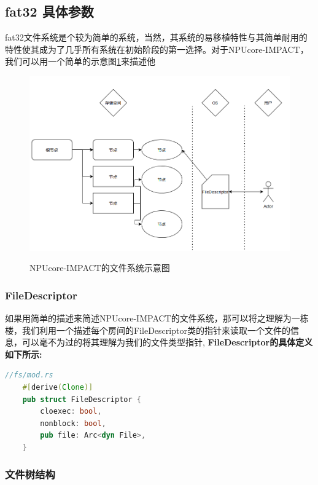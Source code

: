\subsection{fat32 具体参数}

fat32文件系统是个较为简单的系统，当然，其系统的易移植特性与其简单耐用的特性使其成为了几乎所有系统在初始阶段的第一选择。对于NPUcore-IMPACT，我们可以用一个简单的示意图\ref{fig:fs}来描述他

\begin{figure}[htb]
    \centering
    \includegraphics[width=1\linewidth]{figs/dirt.PNG}
    \label{fig:fs}
    \caption{NPUcore-IMPACT的文件系统示意图}
\end{figure}

\subsubsection{FileDescriptor}

如果用简单的描述来简述NPUcore-IMPACT的文件系统，那可以将之理解为一栋楼，我们利用一个描述每个房间的FileDescriptor类的指针来读取一个文件的信息，可以毫不为过的将其理解为我们的文件类型指针, \textbf{FileDescriptor的具体定义如下所示:}

\begin{lstlisting}[language={rust}, label={code:refill}, caption={FileDescriptor}]
    //fs/mod.rs
    #[derive(Clone)]
    pub struct FileDescriptor {
        cloexec: bool,
        nonblock: bool,
        pub file: Arc<dyn File>,
    }
\end{lstlisting}

\subsubsection{文件树结构}

